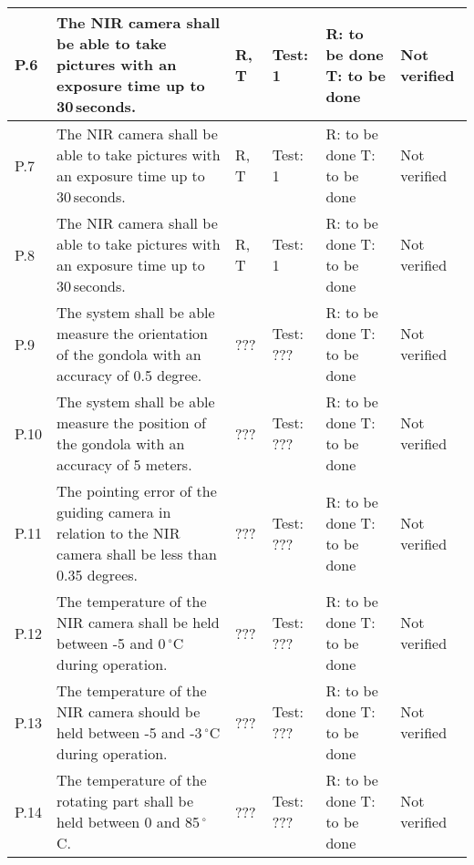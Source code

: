 \begin{longtable}[]{|m{}| m{}|m{}|m{}|m{}|m{}|}
P.6 & The NIR camera shall be able to take pictures with an exposure time up to 30\,seconds.
& R, T & Test: 1 & R: to be done \newline T: to be done & Not verified \\\hline

P.7 & The NIR camera shall be able to take pictures with an exposure time up to 30\,seconds.
& R, T & Test: 1 & R: to be done \newline T: to be done & Not verified \\\hline

P.8 & The NIR camera shall be able to take pictures with an exposure time up to 30\,seconds.
& R, T & Test: 1 & R: to be done \newline T: to be done & Not verified \\\hline

\rowcolor{yellow} P.9 & The system shall be able measure the orientation of the gondola with an accuracy of 0.5 degree.
& ??? & Test: ??? & R: to be done \newline T: to be done & Not verified \\\hline

\rowcolor{yellow} P.10 & The system shall be able measure the position of the gondola with an accuracy of 5 meters.
& ??? & Test: ??? & R: to be done \newline T: to be done & Not verified \\\hline

\rowcolor{yellow} P.11 & The pointing error of the guiding camera in relation to the NIR camera shall be less than 0.35 degrees.
& ??? & Test: ??? & R: to be done \newline T: to be done & Not verified \\\hline

\rowcolor{yellow} P.12 & The temperature of the NIR camera shall be held between -5 and 0\,$^\circ$C during operation.
& ??? & Test: ??? & R: to be done \newline T: to be done & Not verified \\\hline

\rowcolor{yellow} P.13 & The temperature of the NIR camera should be held between -5 and -3\,$^\circ$C during operation.
& ??? & Test: ??? & R: to be done \newline T: to be done & Not verified \\\hline

\rowcolor{yellow} P.14 & The temperature of the rotating part shall be held between 0 and 85\,$^\circ$C.
& ??? & Test: ??? & R: to be done \newline T: to be done & Not verified \\\hline


\end{longtable}
